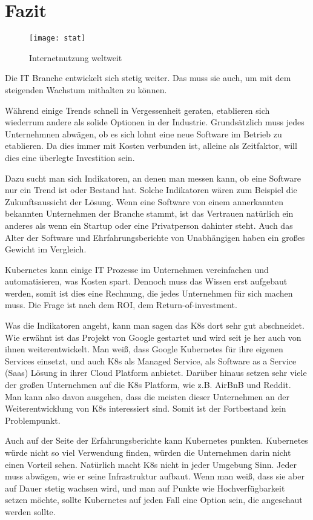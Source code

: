 \newpage
\section{Fazit}

\begin{figure}[H]
\caption{Internetnutzung weltweit}
\texttt{[image: stat]}
\\
\cite[][27.03.2020]{Quelle: https://bit.ly/2TogWCc}
\end{figure}

Die IT Branche entwickelt sich stetig weiter. Das muss sie auch, um mit dem steigenden Wachstum mithalten zu können.

Während einige Trends schnell in Vergessenheit geraten, etablieren sich wiederrum andere als solide Optionen in der Industrie.
Grundsätzlich muss jedes Unternehmnen abwägen, ob es sich lohnt eine neue Software im Betrieb zu etablieren. Da dies immer mit Kosten verbunden ist, alleine als Zeitfaktor, 
will dies eine überlegte Investition sein.

Dazu sucht man sich Indikatoren, an denen man messen kann, ob eine Software nur ein Trend ist oder Bestand hat. Solche Indikatoren wären zum Beispiel die Zukunftsaussicht der Lösung.
Wenn eine Software von einem annerkannten bekannten Unternehmen der Branche stammt, ist das Vertrauen natürlich ein anderes als wenn ein Startup oder eine Privatperson dahinter steht.
Auch das Alter der Software und Ehrfahrungsberichte von Unabhängigen haben ein großes Gewicht im Vergleich.

Kubernetes kann einige IT Prozesse im Unternehmen vereinfachen und automatisieren, was Kosten spart. Dennoch muss das Wissen erst aufgebaut werden, somit ist dies eine Rechnung, die jedes Unternehmen
für sich machen muss. Die Frage ist nach dem ROI, dem Return-of-investment.

Was die Indikatoren angeht, kann man sagen das K8s dort sehr gut abschneidet. Wie erwähnt ist das Projekt von Google gestartet und wird seit je her auch von ihnen weiterentwickelt.
Man weiß, dass Google Kubernetes für ihre eigenen Services einsetzt, und auch K8s als Managed Service, als Software as a Service (Saas) Lösung in ihrer Cloud Platform anbietet.
Darüber hinaus setzen sehr viele der großen Unternehmen auf die K8s Platform, wie z.B. AirBnB und Reddit. Man kann also davon ausgehen, dass die meisten dieser Unternehmen an
der Weiterentwicklung von K8s interessiert sind. Somit ist der Fortbestand kein Problempunkt.

Auch auf der Seite der Erfahrungsberichte kann Kubernetes punkten. Kubernetes würde nicht so viel Verwendung finden, würden die Unternehmen darin nicht einen Vorteil sehen.
Natürlich macht K8s nicht in jeder Umgebung Sinn. Jeder muss abwägen, wie er seine Infrastruktur aufbaut. Wenn man weiß, dass sie aber auf Dauer stetig wachsen wird,
und man auf Punkte wie Hochverfügbarkeit setzen möchte, sollte Kubernetes auf jeden Fall eine Option sein, die angeschaut werden sollte.